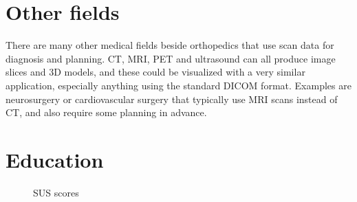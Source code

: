 \documentclass[a4paper]{report}
\begin{document}
\section{Other fields}
There are many other medical fields beside orthopedics that use scan data for diagnosis and planning.
CT, MRI, PET and ultrasound can all produce image slices and 3D models, and these could be visualized with a very similar application, especially anything using the standard DICOM format.
Examples are neurosurgery or cardiovascular surgery that typically use MRI scans instead of CT, and also require some planning in advance.

\section{Education}


\appendix


\begin{figure}[h!]
    \centering
	\hfill
	\caption{SUS scores}\label{sus}
  \small
\end{figure}
\end{document}
